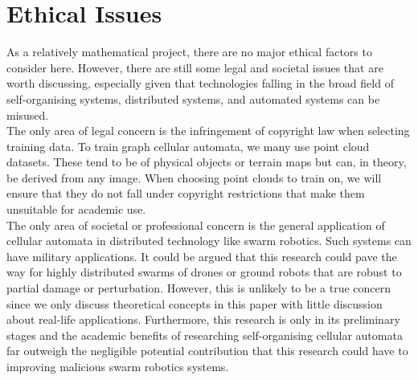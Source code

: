 \chapter{Ethical Issues}

As a relatively mathematical project, there are no major ethical factors to consider here. However, there are still some legal and societal issues that are worth discussing, especially given that technologies falling in the broad field of self-organising systems, distributed systems, and automated systems can be misused.\\

The only area of legal concern is the infringement of copyright law when selecting training data. To train graph cellular automata, we many use point cloud datasets. These tend to be of physical objects or terrain maps but can, in theory, be derived from any image. When choosing point clouds to train on, we will ensure that they do not fall under copyright restrictions that make them unsuitable for academic use.\\

The only area of societal or professional concern is the general application of cellular automata in distributed technology like swarm robotics. Such systems can have military applications. It could be argued that this research could pave the way for highly distributed swarms of drones or ground robots that are robust to partial damage or perturbation. However, this is unlikely to be a true concern since we only discuss theoretical concepts in this paper with little discussion about real-life applications. Furthermore, this research is only in its preliminary stages and the academic benefits of researching self-organising cellular automata far outweigh the negligible potential contribution that this research could have to improving malicious swarm robotics systems.\\